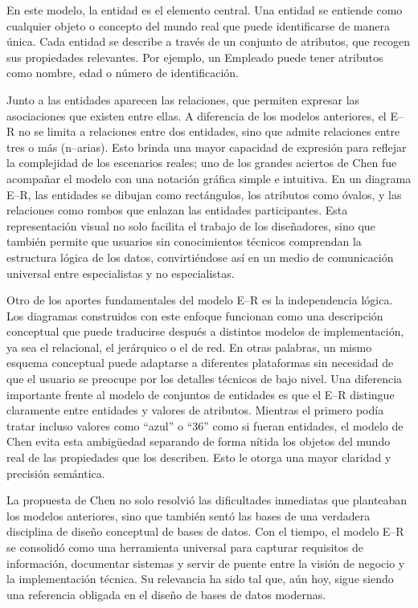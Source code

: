 \documentclass{article}
\begin{document}
En este modelo, la entidad es el elemento central. Una entidad se entiende como cualquier objeto o concepto del mundo real que puede identificarse de manera única. Cada entidad se describe a través de un conjunto de atributos, que recogen sus propiedades relevantes. Por ejemplo, un Empleado puede tener atributos como nombre, edad o número de identificación.

Junto a las entidades aparecen las relaciones, que permiten expresar las asociaciones que existen entre ellas. A diferencia de los modelos anteriores, el E–R no se limita a relaciones entre dos entidades, sino que admite relaciones entre tres o más (n–arias). Esto brinda una mayor capacidad de expresión para reflejar la complejidad de los escenarios reales; uno de los grandes aciertos de Chen fue acompañar el modelo con una notación gráfica simple e intuitiva. En un diagrama E–R, las entidades se dibujan como rectángulos, los atributos como óvalos, y las relaciones como rombos que enlazan las entidades participantes. Esta representación visual no solo facilita el trabajo de los diseñadores, sino que también permite que usuarios sin conocimientos técnicos comprendan la estructura lógica de los datos, convirtiéndose así en un medio de comunicación universal entre especialistas y no especialistas.

Otro de los aportes fundamentales del modelo E–R es la independencia lógica. Los diagramas construidos con este enfoque funcionan como una descripción conceptual que puede traducirse después a distintos modelos de implementación, ya sea el relacional, el jerárquico o el de red. En otras palabras, un mismo esquema conceptual puede adaptarse a diferentes plataformas sin necesidad de que el usuario se preocupe por los detalles técnicos de bajo nivel. Una diferencia importante frente al modelo de conjuntos de entidades es que el E–R distingue claramente entre entidades y valores de atributos. Mientras el primero podía tratar incluso valores como “azul” o “36” como si fueran entidades, el modelo de Chen evita esta ambigüedad separando de forma nítida los objetos del mundo real de las propiedades que los describen. Esto le otorga una mayor claridad y precisión semántica.

La propuesta de Chen no solo resolvió las dificultades inmediatas que planteaban los modelos anteriores, sino que también sentó las bases de una verdadera disciplina de diseño conceptual de bases de datos. Con el tiempo, el modelo E–R se consolidó como una herramienta universal para capturar requisitos de información, documentar sistemas y servir de puente entre la visión de negocio y la implementación técnica. Su relevancia ha sido tal que, aún hoy, sigue siendo una referencia obligada en el diseño de bases de datos modernas.
\end{document}
